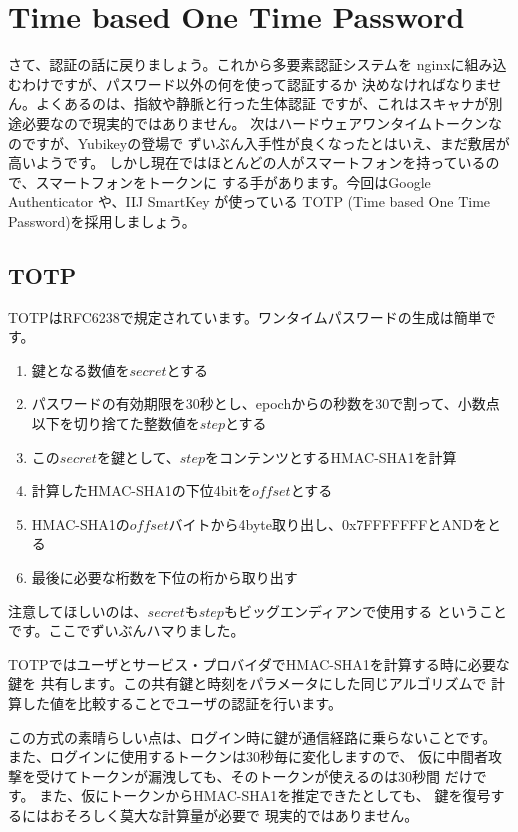 \chapter*{Time based One Time Password}

さて、認証の話に戻りましょう。これから多要素認証システムを
nginxに組み込むわけですが、パスワード以外の何を使って認証するか
決めなければなりません。よくあるのは、指紋や静脈と行った生体認証
ですが、これはスキャナが別途必要なので現実的ではありません。
次はハードウェアワンタイムトークンなのですが、Yubikeyの登場で
ずいぶん入手性が良くなったとはいえ、まだ敷居が高いようです。
しかし現在ではほとんどの人がスマートフォンを持っているので、スマートフォンをトークンに
する手があります。今回はGoogle Authenticator や、IIJ SmartKey が使っている
TOTP (Time based One Time Password)を採用しましょう。

\section*{TOTP}
TOTPはRFC6238で規定されています。ワンタイムパスワードの生成は簡単です。
\begin{enumerate}
\item 鍵となる数値を$secret$とする
\item パスワードの有効期限を30秒とし、epochからの秒数を30で割って、小数点以下を切り捨てた整数値を$step$とする
\item この$secret$を鍵として、$step$をコンテンツとするHMAC-SHA1を計算
\item 計算したHMAC-SHA1の下位4bitを$offset$とする
\item HMAC-SHA1の$offset$バイトから4byte取り出し、0x7FFFFFFFとANDをとる
\item 最後に必要な桁数を下位の桁から取り出す
\end{enumerate}

注意してほしいのは、$secret$も$step$もビッグエンディアンで使用する
ということです。ここでずいぶんハマりました。

TOTPではユーザとサービス・プロバイダでHMAC-SHA1を計算する時に必要な鍵を
共有します。この共有鍵と時刻をパラメータにした同じアルゴリズムで
計算した値を比較することでユーザの認証を行います。

この方式の素晴らしい点は、ログイン時に鍵が通信経路に乗らないことです。
また、ログインに使用するトークンは30秒毎に変化しますので、
仮に中間者攻撃を受けてトークンが漏洩しても、そのトークンが使えるのは30秒間
だけです。
また、仮にトークンからHMAC-SHA1を推定できたとしても、
鍵を復号するにはおそろしく莫大な計算量が必要で
現実的ではありません。


